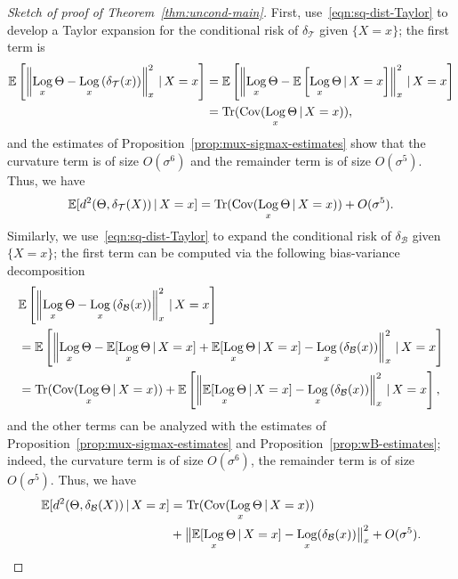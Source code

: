\documentclass[preprint]{imsart}
\theoremstyle{plain}
\theoremstyle{definition}
\newcommand{\Ebb}{\mathbb{E}}
\newcommand{\Cov}{\textnormal{Cov}}
\newcommand{\trace}{\operatorname{Tr}}
\newcommand{\B}{\mathcal{B}}
\newcommand{\T}{\mathcal{T}}
\DeclareMathOperator{\Log}{Log}
\begin{document}
\begin{proof}[Sketch of proof of Theorem~\ref{thm:uncond-main}]
    First, use~\eqref{eqn:sq-dist-Taylor} to develop a Taylor expansion for the conditional risk of $\delta_{\T}$ given $\{X=x\}$; the first term is 
    \begin{align*}
        \Ebb\left[\left\|\Log_x\Theta-\Log_x\left(\delta_{\T}(x)\right)\right\|_x^2\,|\,X=x\right] &= \Ebb\left[\left\|\Log_x\Theta-\Ebb\left[\Log_x\Theta\,|\,X=x\right]\right\|_x^2\,|\,X=x\right] \\
        &= \trace(\Cov(\Log_x\Theta\,|\,X=x)),
    \end{align*}
    and the estimates of Proposition~\ref{prop:mux-sigmax-estimates} show that the curvature term is of size $O(\sigma^6)$ and the remainder term is of size $O(\sigma^5)$.
    Thus, we have
    \begin{equation}\label{eqn:proof-sketch-1}
        \Ebb[d^2(\Theta,\delta_{\T}(X))\,|\,X=x] = \trace(\Cov(\Log_x\Theta\,|\,X=x)) + O(\sigma^5).
    \end{equation}
    Similarly, we use~\eqref{eqn:sq-dist-Taylor} to expand the conditional risk of $\delta_{\B}$ given $\{X=x\}$; the first term can be computed via the following bias-variance decomposition
    \begin{align*}
        &\Ebb\left[\left\|\Log_x\Theta-\Log_x\left(\delta_{\B}(x)\right)\right\|_x^2\,|\,X=x\right] \\
        &=\Ebb\left[\left\|\Log_x\Theta-\Ebb[\Log_x\Theta\,|\,X=x]+\Ebb[\Log_x\Theta\,|\,X=x]-\Log_x\left(\delta_{\B}(x)\right)\right\|_x^2\,|\,X=x\right] \\
        &=\trace(\Cov(\Log_x\Theta\,|\,X=x)) + \Ebb\left[\left\|\Ebb[\Log_x\Theta\,|\,X=x] - \Log_x\left(\delta_{\B}(x)\right)\right\|_x^2\,|\,X=x\right],
    \end{align*}
    and the other terms can be analyzed with the estimates of Proposition~\ref{prop:mux-sigmax-estimates} and Proposition~\ref{prop:wB-estimates}; indeed, the curvature term is of size $O(\sigma^6)$, the remainder term is of size $O(\sigma^5)$.
    Thus, we have
    \begin{equation}\label{eqn:proof-sketch-2}
        \begin{split}
        \Ebb[d^2(\Theta,\delta_{\B}(X))\,|\,X=x] &= \trace(\Cov(\Log_x\Theta\,|\,X=x)) \\
        &+ \big\|\Ebb[\Log_x\Theta\,|\,X=x]-\Log_x(\delta_{\B}(x)) \big\|_x^2 + O(\sigma^5).
        \end{split}
    \end{equation}

\end{proof}
\end{document}
